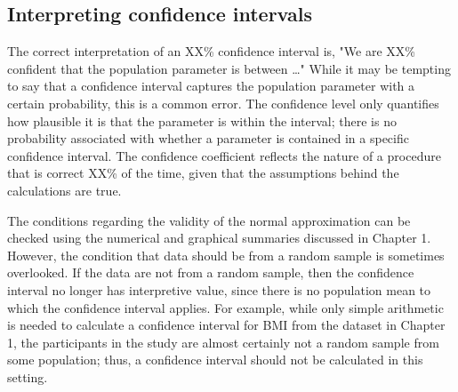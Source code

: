 
\subsection{Interpreting confidence intervals}
\label{interpretingCIs}


The correct interpretation of an XX\% confidence interval is, "We are XX\% confident that the population parameter is between \dots" While it may be tempting to say that a confidence interval captures the population parameter with a certain probability, this is a common error. The confidence level only quantifies how plausible it is that the parameter is within the interval; there is no probability associated with whether a parameter is contained in a specific confidence interval. The confidence coefficient reflects the nature of a procedure that is correct XX\% of the time, given that the assumptions behind the calculations are true.

The conditions regarding the validity of the normal approximation can be checked using the numerical and graphical summaries discussed in Chapter 1. However, the condition that data should be from a random sample is sometimes overlooked. If the data are not from a random sample, then the confidence interval no longer has interpretive value, since there is no population mean to which the confidence interval applies. For example, while only simple arithmetic is needed to calculate a confidence interval for BMI from the  dataset in Chapter 1, the participants in the study are almost certainly not a random sample from some population; thus, a confidence interval should not be calculated in this setting.

